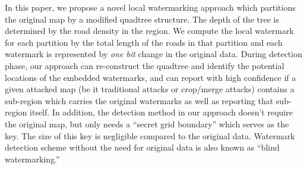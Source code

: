 

In this paper, we propose a novel local watermarking approach which
partitions the original map by a modified quadtree structure. The depth of
the tree is determined by the road density in the region.
We compute the local watermark for each partition by 
the total length of the roads in that partition and 
each watermark is represented by {\em one bit} change in the original data. 
During detection phase, our approach can re-construct the quadtree
and identify the potential locations of the embedded watermarks, and can
report with high confidence if a given attacked map (be it traditional
attacks or crop/merge attacks) contains a sub-region which carries the
original watermarks as well as reporting that sub-region itself. 
In addition, the detection method in our approach
doesn't require the original map,
but only needs a ``secret grid boundary'' which serves as the key. The size
of this key is negligible compared to the original data. Watermark detection
scheme without the need for original data is also known as ``blind
watermarking.''
 
